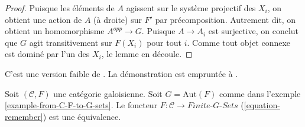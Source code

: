 \begin{proof}
\medskip\noindent
Puisque les éléments de $A$ agissent sur le système projectif des $X_i$, on obtient une action de
$A$ (à droite) sur $F'$ par précomposition. Autrement dit, on obtient
un homomorphisme $A^{opp} \to G$. Puisque $A \to A_i$ est surjective, on conclut
que $G$ agit transitivement sur $F(X_i)$ pour tout $i$. Comme tout objet connexe
est dominé par l'un des $X_i$, le lemme en découle.
\end{proof}

\begin{proposition}
\label{proposition-galois}
\begin{reference}
C'est une version faible de \cite[Expos\'e V]{SGA1}.
La démonstration est empruntée à \cite[Théorème 7.2.5]{BS}.
\end{reference}
Soit $(\mathcal{C}, F)$ une catégorie galoisienne. Soit $G = \text{Aut}(F)$
comme dans l'exemple \ref{example-from-C-F-to-G-sets}. Le foncteur
$F : \mathcal{C} \to \textit{Finite-}G\textit{-Sets}$
(\ref{equation-remember}) est une équivalence.
\end{proposition}

